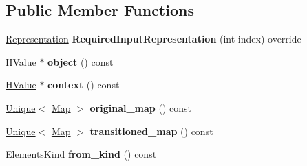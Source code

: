 \subsection*{Public Member Functions}
\begin{DoxyCompactItemize}
\item 
\hyperlink{classv8_1_1internal_1_1_representation}{Representation} {\bfseries Required\+Input\+Representation} (int index) override\hypertarget{classv8_1_1internal_1_1_h_transition_elements_kind_aa34e3e43f72e7fb17d10e55c59922cb6}{}\label{classv8_1_1internal_1_1_h_transition_elements_kind_aa34e3e43f72e7fb17d10e55c59922cb6}

\item 
\hyperlink{classv8_1_1internal_1_1_h_value}{H\+Value} $\ast$ {\bfseries object} () const \hypertarget{classv8_1_1internal_1_1_h_transition_elements_kind_affe4257a34254d55775ffbd7595d1a89}{}\label{classv8_1_1internal_1_1_h_transition_elements_kind_affe4257a34254d55775ffbd7595d1a89}

\item 
\hyperlink{classv8_1_1internal_1_1_h_value}{H\+Value} $\ast$ {\bfseries context} () const \hypertarget{classv8_1_1internal_1_1_h_transition_elements_kind_a6cf96942f3115c914282ea5a1ba52ab1}{}\label{classv8_1_1internal_1_1_h_transition_elements_kind_a6cf96942f3115c914282ea5a1ba52ab1}

\item 
\hyperlink{classv8_1_1internal_1_1_unique}{Unique}$<$ \hyperlink{classv8_1_1internal_1_1_map}{Map} $>$ {\bfseries original\+\_\+map} () const \hypertarget{classv8_1_1internal_1_1_h_transition_elements_kind_ac60e93057f41d28e37547fa31b550697}{}\label{classv8_1_1internal_1_1_h_transition_elements_kind_ac60e93057f41d28e37547fa31b550697}

\item 
\hyperlink{classv8_1_1internal_1_1_unique}{Unique}$<$ \hyperlink{classv8_1_1internal_1_1_map}{Map} $>$ {\bfseries transitioned\+\_\+map} () const \hypertarget{classv8_1_1internal_1_1_h_transition_elements_kind_a59bf8b195879b1ad373d136902a905c8}{}\label{classv8_1_1internal_1_1_h_transition_elements_kind_a59bf8b195879b1ad373d136902a905c8}

\item 
Elements\+Kind {\bfseries from\+\_\+kind} () const \hypertarget{classv8_1_1internal_1_1_h_transition_elements_kind_a2ad2b1752d7f7ae67140f496af1e972b}{}\label{classv8_1_1internal_1_1_h_transition_elements_kind_a2ad2b1752d7f7ae67140f496af1e972b}


\end{DoxyCompactItemize}

